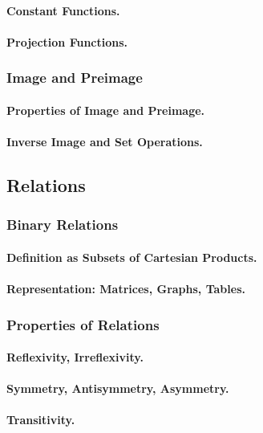 \paragraph{Constant Functions.}
\paragraph{Projection Functions.}

\subsubsection{Image and Preimage}
\paragraph{Properties of Image and Preimage.}
\paragraph{Inverse Image and Set Operations.}

\subsection{Relations}
\label{subsec:relations}

\subsubsection{Binary Relations}
\paragraph{Definition as Subsets of Cartesian Products.}
\paragraph{Representation: Matrices, Graphs, Tables.}

\subsubsection{Properties of Relations}
\paragraph{Reflexivity, Irreflexivity.}
\paragraph{Symmetry, Antisymmetry, Asymmetry.}
\paragraph{Transitivity.}

